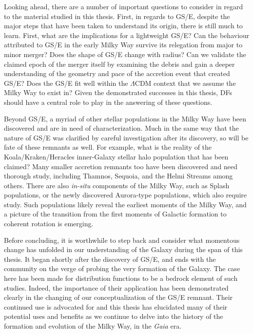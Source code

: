 Looking ahead, there are a number of important questions to consider in regard to the material studied in this thesis. First, in regards to GS/E, despite the major steps that have been taken to understand its origin, there is still much to learn. First, what are the implications for a lightweight GS/E? Can the behaviour attributed to GS/E in the early Milky Way survive its relegation from major to minor merger? Does the shape of GS/E change with radius? Can we validate the claimed epoch of the merger itself by examining the debris and gain a deeper understanding of the geometry and pace of the accretion event that created GS/E? Does the GS/E fit well within the $\Lambda$CDM context that we assume the Milky Way to exist in? Given the demonstrated successes in this thesis, DFs should have a central role to play in the answering of these questions.

Beyond GS/E, a myriad of other stellar populations in the Milky Way have been discovered and are in need of characterization. Much in the same way that the nature of GS/E was clarified by careful investigation after its discovery, so will be fate of these remnants as well. For example, what is the reality of the Koala/Kraken/Heracles inner-Galaxy stellar halo population that has been claimed? Many smaller accretion remnants too have been discovered and need thorough study, including Thamnos, Sequoia, and the Helmi Streams among others. There are also \textit{in-situ} components of the Milky Way, such as Splash populations, or the newly discovered Aurora-type populations, which also require study. Such populations likely reveal the earliest moments of the Milky Way, and a picture of the transition from the first moments of Galactic formation to coherent rotation is emerging.

Before concluding, it is worthwhile to step back and consider what momentous change has unfolded in our understanding of the Galaxy during the span of this thesis. It began shortly after the discovery of GS/E, and ends with the community on the verge of probing the very formation of the Galaxy. The case here has been made for distribution functions to be a bedrock element of such studies. Indeed, the importance of their application has been demonstrated clearly in the changing of our conceptualization of the GS/E remnant. Their continued use is advocated for and this thesis has elucidated many of their potential uses and benefits as we continue to delve into the history of the formation and evolution of the Milky Way, in the \textit{Gaia} era.